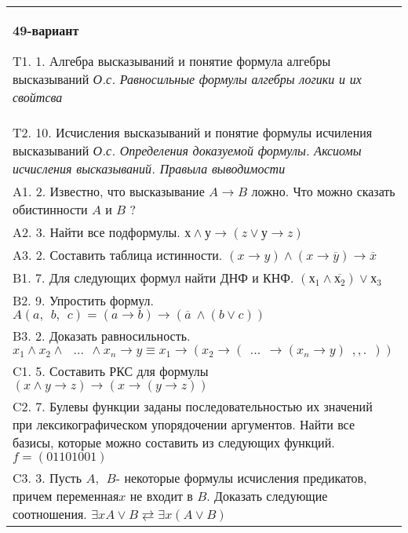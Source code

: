 \documentclass{article}
\begin{document}
\begin{tabular}{m{17cm}}
\textbf{49-вариант}
\newline

T1. 1. Алгебра высказываний и понятие формула алгебры высказываний \emph{О.с. Равносильные формулы алгебры логики и их свойтсва} \\
T2. 10. Исчисления высказываний и понятие формулы исчиления высказываний \emph{О.с. Определения доказуемой формулы. Аксиомы исчисления высказываний. Правыла выводимости} \\
A1. 2. Известно, что высказывание \(A \rightarrow B\) ложно. Что можно сказать обистинности \(A\) и \(B\) ? \\
A2. 3. Найти все подформулы. \(х \land у \rightarrow (z \vee у \rightarrow z)\) \\
A3. 2. Составить таблица истинности. \((x \rightarrow y) \land (x \rightarrow \overline{y}) \rightarrow \overline{x}\) \\
B1. 7. Для следующих формул найти ДНФ и КНФ. \(\left( х_{1} \land \overline{х_{2}} \right) \vee х_{3}\) \\
B2. 9. Упростить формул. \(A(a,\ \ b,\ \ c) = (a \rightarrow b) \rightarrow (\overline{a}\  \land (b \vee c))\) \\
B3. 2. Доказать равносильность.\(x_{1} \land x_{2} \land \ \ \ ...\ \  \land x_{n} \rightarrow y \equiv x_{1} \rightarrow (x_{2} \rightarrow (\ \ ...\ \  \rightarrow (x_{n} \rightarrow y)\ \ ,,.\ \ ))\) \\
C1. 5. Составить РКС для формулы \((x \land y \rightarrow z) \rightarrow (x \rightarrow (y \rightarrow z))\) \\
C2. 7. Булевы функции заданы последовательностью их значений при лексикографическом упорядочении аргументов. Найти все базисы, которые можно составить из следующих функций. \(f = (01101001)\) \\
C3. 3. Пусть \(A,\ \ B\)- некоторые формулы исчисления предикатов, причем переменная\(x\) не входит в \(B\). Доказать следующие соотношения. \(\exists xA \vee B \rightleftarrows \exists x(A \vee B)\) \\

\end{tabular}
\vspace{1cm}
\end{document}
